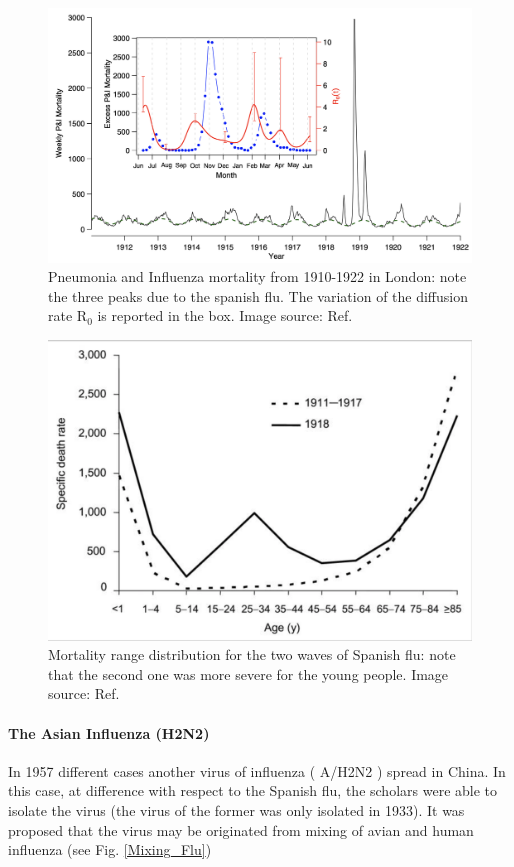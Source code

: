 \documentclass[
12pt, %
a4paper, %
oneside, %
headinclude,footinclude, %
BCOR5mm, %
]{scrartcl}
\begin{document}
\begin{figure}[h]
 \centering
 \includegraphics[width=1\linewidth]{Figures/SpanishFLU.png} 
 \caption{Pneumonia and Influenza mortality from 1910-1922 in London: note the three peaks due to the spanish flu. The variation of the diffusion rate R$_{0}$ is reported in the box. Image source: Ref. \cite{he2011mechanistic} }
 \label{SpanishFLU}
\end{figure}

\begin{figure}[h]
 \centering
 \includegraphics[width=0.6\linewidth]{Figures/Mortality_spanish_flu.png} 
 \caption{Mortality range distribution for the two waves of Spanish flu: note that the second one was more severe for the young people. Image source: Ref. \cite{taubenberger20061918}}
 \label{Mortality_spanish_flu}
\end{figure}

\clearpage

\paragraph{The Asian Influenza (H2N2)}

In 1957 different cases another virus of influenza ( A/H2N2 ) spread in China. In this case, at difference with respect to the Spanish flu, the scholars were able to isolate the virus (the virus of the former was only isolated in 1933). It was proposed that the virus may be originated from mixing of avian and human influenza (see Fig. \ref{Mixing_Flu})
\end{document}
